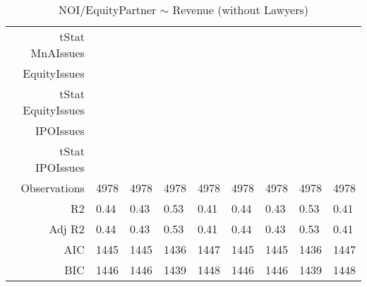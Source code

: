 \begin{table}[ht]
\begin{tabular}{rllllllll}
  tStat MnAIssues &  &  &  &  &  &  &  &  \\ 
  EquityIssues &  &  &  &  &  &  &  &  \\ 
  tStat EquityIssues &  &  &  &  &  &  &  &  \\ 
  IPOIssues &  &  &  &  &  &  &  &  \\ 
  tStat IPOIssues &  &  &  &  &  &  &  &  \\ 
  Observations & 4978 & 4978 & 4978 & 4978 & 4978 & 4978 & 4978 & 4978 \\ 
  R2 & 0.44 & 0.43 & 0.53 & 0.41 & 0.44 & 0.43 & 0.53 & 0.41 \\ 
  Adj R2 & 0.44 & 0.43 & 0.53 & 0.41 & 0.44 & 0.43 & 0.53 & 0.41 \\ 
  AIC & 1445 & 1445 & 1436 & 1447 & 1445 & 1445 & 1436 & 1447 \\ 
  BIC & 1446 & 1446 & 1439 & 1448 & 1446 & 1446 & 1439 & 1448 \\ 
   \hline
\end{tabular}
\caption{NOI/EquityPartner $\sim$ Revenue (without Lawyers)} 
\end{table}
